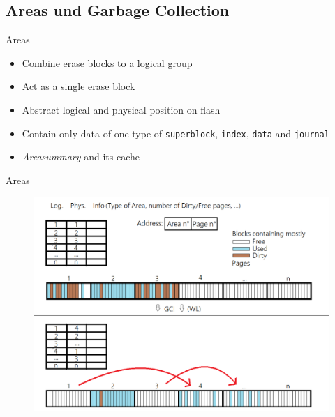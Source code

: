 \documentclass[
	,footlinenumber
	,navline=true
	,footlineauthor
	,ngerman
	]{beamer}
\begin{document}
\subsection{Areas und Garbage Collection}
\begin{frame}{Areas}
	\begin{block}{}
		\begin{itemize}
			\item Combine erase blocks to a logical group
			\item Act as a single erase block
			\item Abstract logical and physical position on flash
			\item Contain only data of one type of \texttt{superblock}, \texttt{index}, \texttt{data} and \texttt{journal}
			\item \textit{Areasummary} and its cache
		\end{itemize}
	\end{block}
\end{frame}

\begin{frame}{Areas}
	\begin{figure}[H]
		\centering
		\includegraphics[height=0.9\textheight]{../images/Areas_address.png}
	\end{figure}
\end{frame}
\end{document}
